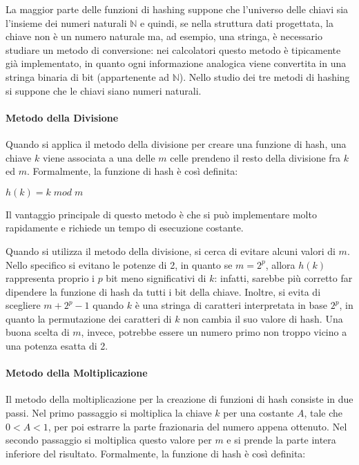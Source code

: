 La maggior parte delle funzioni di hashing suppone che l'universo delle chiavi sia l'insieme dei numeri naturali \(\mathbb{N}\) e quindi, se nella struttura dati progettata, la chiave non è un numero naturale ma, ad esempio, una stringa, è necessario studiare un metodo di conversione: nei calcolatori questo metodo è tipicamente già implementato, in quanto ogni informazione analogica viene convertita in una stringa binaria di bit (appartenente ad \(\mathbb{N}\)). Nello studio dei tre metodi di hashing si suppone che le chiavi siano numeri naturali.

\paragraph{Metodo della Divisione} Quando si applica il metodo della divisione per creare una funzione di hash, una chiave \(k\) viene associata a una delle \(m\) celle prendeno il resto della divisione fra \(k\) ed \(m\). Formalmente, la funzione di hash è così definita:

\(h(k)=k\; mod\; m\)

\noindent Il vantaggio principale di questo metodo è che si può implementare molto rapidamente e richiede un tempo di esecuzione costante. 

Quando si utilizza il metodo della divisione, si cerca di evitare alcuni valori di \(m\). Nello specifico si evitano le potenze di 2, in quanto se \(m=2^p\), allora \(h(k)\) rappresenta proprio i \(p\) bit meno significativi di \(k\): infatti, sarebbe più corretto far dipendere la funzione di hash da tutti i bit della chiave. Inoltre, si evita di scegliere \(m+2^p-1\) quando \(k\) è una stringa di caratteri interpretata in base \(2^p\), in quanto la permutazione dei caratteri di \(k\) non cambia il suo valore di hash. Una buona scelta di \(m\), invece, potrebbe essere un numero primo non troppo vicino a una potenza esatta di 2.

\paragraph{Metodo della Moltiplicazione} Il metodo della moltiplicazione per la creazione di funzioni di hash consiste in due passi. Nel primo passaggio si moltiplica la chiave \(k\) per una costante \(A\), tale che \(0<A<1\), per poi estrarre la parte frazionaria del numero appena ottenuto. Nel secondo passaggio si moltiplica questo valore per \(m\) e si prende la parte intera inferiore del risultato. Formalmente, la funzione di hash è così definita:

